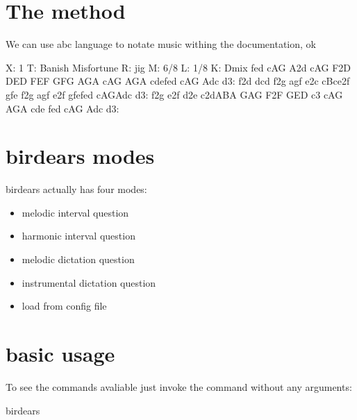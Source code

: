 \documentclass[letterpaper,10pt,english]{sphinxmanual}
\begin{document}
\section{The method}
\label{\detokenize{index:the-method}}
We can use abc language to notate music withing the documentation, ok

\begin{sphinxVerbatim}[commandchars=\\\{\}]
X: 1
T: Banish Misfortune
R: jig
M: 6/8
L: 1/8
K: Dmix
fed cAG\textbar{} A2d cAG\textbar{} F2D DED\textbar{} FEF GFG\textbar{}
AGA cAG\textbar{} AGA cde\textbar{}fed cAG\textbar{} Ad\PYGZca{}c d3:\textbar{}
f2d d\PYGZca{}cd\textbar{} f2g agf\textbar{} e2c cBc\textbar{}e2f gfe\textbar{}
f2g agf\textbar{} e2f gfe\textbar{}fed cAG\textbar{}Ad\PYGZca{}c d3:\textbar{}
f2g e2f\textbar{} d2e c2d\textbar{}ABA GAG\textbar{} F2F GED\textbar{}
c3 cAG\textbar{} AGA cde\textbar{} fed cAG\textbar{} Ad\PYGZca{}c d3:\textbar{}
\end{sphinxVerbatim}


\section{birdears modes}
\label{\detokenize{index:birdears-modes}}
birdears actually has four modes:
\begin{itemize}
\item {} 
melodic interval question

\item {} 
harmonic interval question

\item {} 
melodic dictation question

\item {} 
instrumental dictation question

\item {} 
load from config file

\end{itemize}


\section{basic usage}
\label{\detokenize{index:basic-usage}}
To see the commands avaliable just invoke the command without any arguments:

\begin{sphinxVerbatim}[commandchars=\\\{\}]
birdears
\end{sphinxVerbatim}
\end{document}

